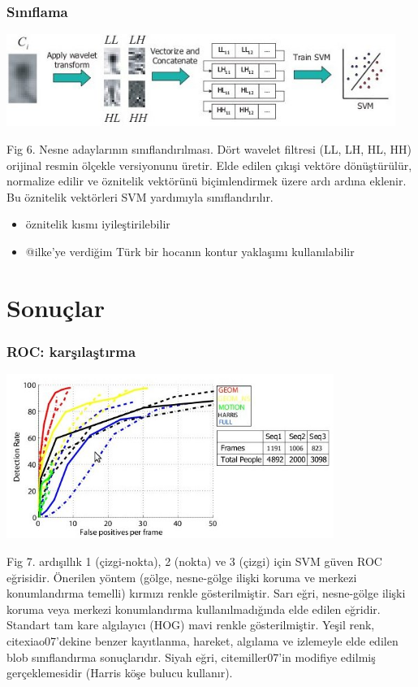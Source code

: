 \documentclass{beamer}
\begin{document}
\begin{frame}
	\frametitle{Sınıflama}

	\includegraphics[width=0.95\textwidth]{img/fig6.jpg}\label{fig:classification}

	Fig 6. Nesne adaylarının sınıflandırılması. Dört wavelet filtresi (LL, LH,
	HL, HH) orijinal resmin ölçekle versiyonunu üretir. Elde edilen çıkışi
	vektöre dönüştürülür, normalize edilir ve öznitelik vektörünü biçimlendirmek
	üzere ardı ardına eklenir. Bu öznitelik vektörleri SVM yardımıyla
	sınıflandırılır.

	\begin{itemize}
		\item öznitelik kısmı iyileştirilebilir
		\item @ilke'ye verdiğim Türk bir hocanın kontur yaklaşımı kullanılabilir
	\end{itemize}
\end{frame}

\section{Sonuçlar}

\begin{frame}
	\frametitle{ROC: karşılaştırma}

	\includegraphics[width=0.8\textwidth]{img/fig7.jpg}\label{fig:ROC}

	\begin{scriptsize}
		Fig 7. ardışıllık 1 (çizgi-nokta), 2 (nokta) ve 3 (çizgi) için SVM güven ROC
		eğrisidir. Önerilen yöntem (gölge, nesne-gölge ilişki koruma ve merkezi
		konumlandırma temelli) kırmızı renkle gösterilmiştir. Sarı eğri, nesne-gölge
		ilişki koruma veya merkezi konumlandırma kullanılmadığında elde edilen
		eğridir. Standart tam kare algılayıcı (HOG) mavi renkle gösterilmiştir.
		Yeşil renk, cite{xiao07}'dekine benzer kayıtlanma, hareket, algılama ve
		izlemeyle elde edilen blob sınıflandırma sonuçlarıdır. Siyah eğri,
		cite{miller07}'in modifiye edilmiş gerçeklemesidir (Harris köşe bulucu
		kullanır).
	\end{scriptsize}
\end{frame}
\end{document}
